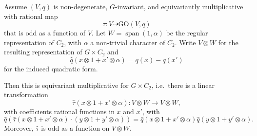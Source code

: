 \documentclass[10pt,a4paper]{amsart}
\newcommand{\GO}{\mathrm{GO}}
\newcommand{\wQ}{\widehat{q}}
\newcommand{\wT}{\widehat{\tau}}
\begin{document}
\begin{prop}
Assume $(V,q)$ is non-degenerate, $G$-invariant, and 
equivariantly multiplicative with rational map
$$\tau:V \dashrightarrow \GO(V,q)$$
that is odd as a function of $V$.
Let $W=\operatorname{span}(1,\alpha)$ be the regular representation of $C_2$, with $\alpha$ a non-trivial character of $C_2$. Write
$V\otimes W$ for the resulting representation of $G\times C_2$ and 
$$\wQ(x\otimes 1+x'\otimes \alpha) = q(x) - q(x')$$
for the induced quadratic form.

Then this is equivariant multiplicative for $G\times C_2$, i.e.~there is a linear transformation
$$\wT(x\otimes 1 + x'\otimes \alpha): V\otimes W \rightarrow V\otimes W,$$
with coefficients rational functions in $x$ and $x'$,
with
$$\wQ(\wT(x\otimes 1 + x'\otimes \alpha)\cdot
(y\otimes 1 + y'\otimes \alpha))=
\wQ(x\otimes 1 + x'\otimes \alpha)
\wQ(y\otimes 1 + y'\otimes \alpha).$$
Moreover, $\wT$ is odd as a function on $V\otimes W$.
\end{prop}
\end{document}
